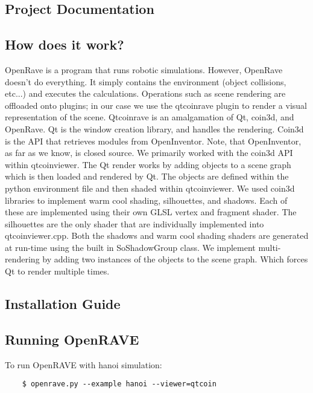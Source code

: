 \documentclass[10pt,journal,compsoc,draftclsnofoot]{IEEEtran}
\begin{document}
\begin{flushleft}
\newpage

\section{Project Documentation}

\subsection{How does it work?}

OpenRave is a program that runs robotic simulations.
However, OpenRave doesn't do everything.
It simply contains the environment (object collisions, etc...) and executes the calculations.
Operations such as scene rendering are offloaded onto plugins; in our case we use the qtcoinrave plugin to render a visual representation of the scene.
Qtcoinrave is an amalgamation of Qt, coin3d, and OpenRave.
Qt is the window creation library, and handles the rendering.
Coin3d is the API that retrieves modules from OpenInventor.
Note, that OpenInventor, as far as we know, is closed source.
We primarily worked with the coin3d API within qtcoinviewer.
The Qt render works by adding objects to a scene graph which is then loaded and rendered by Qt.
The objects are defined within the python environment file and then shaded within qtcoinviewer.
We used coin3d libraries to implement warm cool shading, silhouettes, and shadows.
Each of these are implemented using their own GLSL vertex and fragment shader.
The silhouettes are the only shader that are individually implemented into qtcoinviewer.cpp.
Both the shadows and warm cool shading shaders are generated at run-time using the built in SoShadowGroup class.
We implement multi-rendering by adding two instances of the objects to the scene graph.
Which forces Qt to render multiple times.

\newpage

\subsection{Installation Guide}


\newpage

\subsection{Running OpenRAVE}

To run OpenRAVE with hanoi simulation:

\begin{lstlisting}
    $ openrave.py --example hanoi --viewer=qtcoin
\end{lstlisting}


\end{flushleft}
\end{document}
